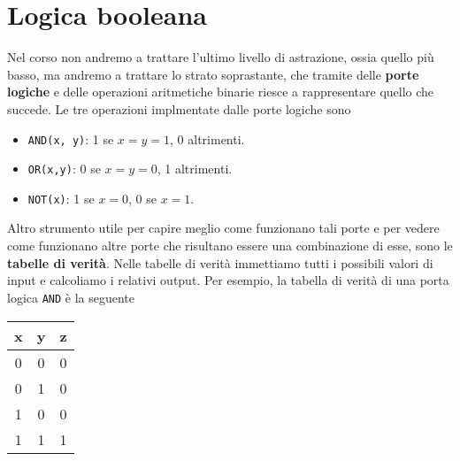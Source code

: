\section{Logica booleana}
Nel corso non andremo a trattare l'ultimo livello di astrazione, ossia quello più basso, ma andremo
a trattare lo strato soprastante, che tramite delle \textbf{porte logiche} e delle operazioni
aritmetiche binarie riesce a rappresentare quello che succede. Le tre operazioni implmentate dalle
porte logiche sono
\begin{itemize}
	\item \verb|AND(x, y)|: 1 se $x = y = 1$, 0 altrimenti.
	\item \verb|OR(x,y)|: 0 se $x = y = 0$, 1 altrimenti.
	\item \verb|NOT(x)|: 1 se $x = 0$, 0 se $x = 1$.
\end{itemize}
Altro strumento utile per capire meglio come funzionano tali porte e per vedere come funzionano
altre porte che risultano essere una combinazione di esse, sono le \textbf{tabelle di verità}.
Nelle tabelle di verità immettiamo tutti i possibili valori di input e calcoliamo i relativi output.
Per esempio, la tabella di verità di una porta logica \verb|AND| è la seguente
\begin{center}
	\begin{tabular}{c c | c}
		x & y & z \\ \hline
		0 & 0 & 0 \\
		0 & 1 & 0 \\
		1 & 0 & 0 \\
		1 & 1 & 1
	\end{tabular}
\end{center}
